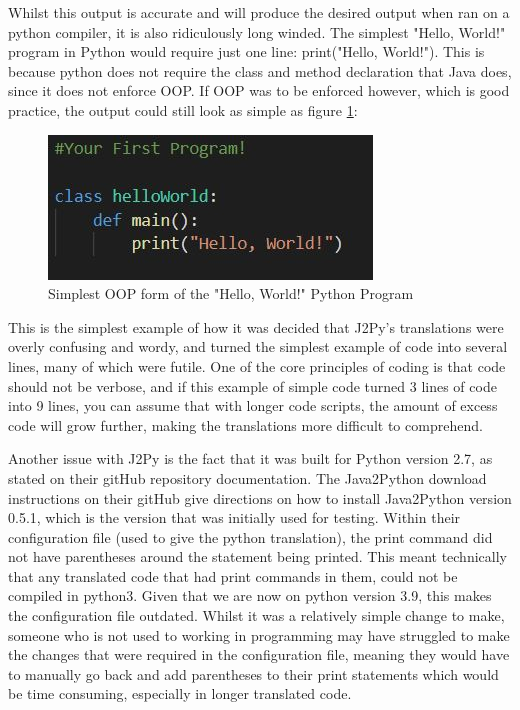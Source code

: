 \documentclass{l4proj}
\begin{document}
Whilst this output is accurate and will produce the desired output when ran on a python compiler, it is also ridiculously long winded. The simplest "Hello, World!" program in Python would require just one line: print("Hello, World!"). This is because python does not require the class and method declaration that Java does, since it does not enforce OOP. If OOP was to be enforced however, which is good practice, the output could still look as simple as figure \ref{fig:helloWorldPy}:

\begin{figure}[htb]
    \centering
    \includegraphics[width=1\linewidth]{images/helloWorldPy.JPG}
        \caption{Simplest OOP form of the "Hello, World!" Python Program
    }
    \label{fig:helloWorldPy} 
\end{figure}

This is the simplest example of how it was decided that J2Py's translations were overly confusing and wordy, and turned the simplest example of code into several lines, many of which were futile. One of the core principles of coding is that code should not be verbose, and if this example of simple code turned 3 lines of code into 9 lines, you can assume that with longer code scripts, the amount of excess code will grow further, making the translations more difficult to comprehend.

Another issue with J2Py is the fact that it was built for Python version 2.7, as stated on their gitHub repository documentation. The Java2Python download instructions on their gitHub give directions on how to install Java2Python version 0.5.1, which is the version that was initially used for testing. Within their configuration file (used to give the python translation), the print command did not have parentheses around the statement being printed. This meant technically that any translated code that had print commands in them, could not be compiled in python3. Given that we are now on python version 3.9, this makes the configuration file outdated. Whilst it was a relatively simple change to make, someone who is not used to working in programming may have struggled to make the changes that were required in the configuration file, meaning they would have to manually go back and add parentheses to their print statements which would be time consuming, especially in longer translated code.
\end{document}
